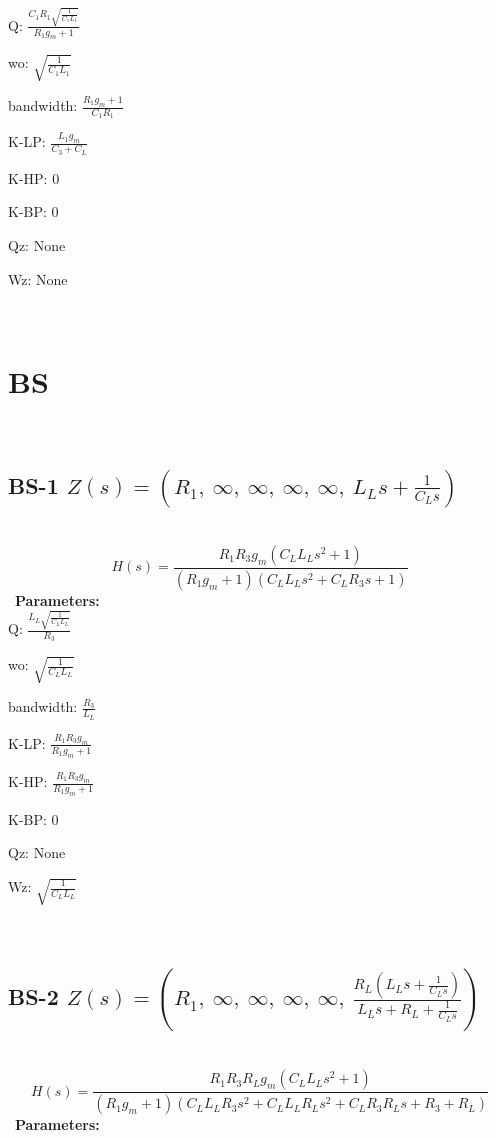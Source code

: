 \documentclass{article}
\begin{document}
Q: $\frac{C_{1} R_{1} \sqrt{\frac{1}{C_{1} L_{1}}}}{R_{1} g_{m} + 1}$\ 

wo: $\sqrt{\frac{1}{C_{1} L_{1}}}$\ 

bandwidth: $\frac{R_{1} g_{m} + 1}{C_{1} R_{1}}$\ 

K-LP: $\frac{L_{1} g_{m}}{C_{3} + C_{L}}$\ 

K-HP: $0$\ 

K-BP: $0$\ 

Qz: $\text{None}$\ 

Wz: $\text{None}$\ 

\ 

\section{BS}\ 
\subsection{BS-1 $Z(s) = \left( R_{1}, \  \infty, \  \infty, \  \infty, \  \infty, \  L_{L} s + \frac{1}{C_{L} s}\right)$ } \ 
\textbf{\[H(s) = \frac{R_{1} R_{3} g_{m} \left(C_{L} L_{L} s^{2} + 1\right)}{\left(R_{1} g_{m} + 1\right) \left(C_{L} L_{L} s^{2} + C_{L} R_{3} s + 1\right)}\] } \ 
\textbf{Parameters:}\\ 

Q: $\frac{L_{L} \sqrt{\frac{1}{C_{L} L_{L}}}}{R_{3}}$\ 

wo: $\sqrt{\frac{1}{C_{L} L_{L}}}$\ 

bandwidth: $\frac{R_{3}}{L_{L}}$\ 

K-LP: $\frac{R_{1} R_{3} g_{m}}{R_{1} g_{m} + 1}$\ 

K-HP: $\frac{R_{1} R_{3} g_{m}}{R_{1} g_{m} + 1}$\ 

K-BP: $0$\ 

Qz: $\text{None}$\ 

Wz: $\sqrt{\frac{1}{C_{L} L_{L}}}$\ 

\ 

\subsection{BS-2 $Z(s) = \left( R_{1}, \  \infty, \  \infty, \  \infty, \  \infty, \  \frac{R_{L} \left(L_{L} s + \frac{1}{C_{L} s}\right)}{L_{L} s + R_{L} + \frac{1}{C_{L} s}}\right)$ } \ 
\textbf{\[H(s) = \frac{R_{1} R_{3} R_{L} g_{m} \left(C_{L} L_{L} s^{2} + 1\right)}{\left(R_{1} g_{m} + 1\right) \left(C_{L} L_{L} R_{3} s^{2} + C_{L} L_{L} R_{L} s^{2} + C_{L} R_{3} R_{L} s + R_{3} + R_{L}\right)}\] } \ 
\textbf{Parameters:}\\ 
\end{document}
